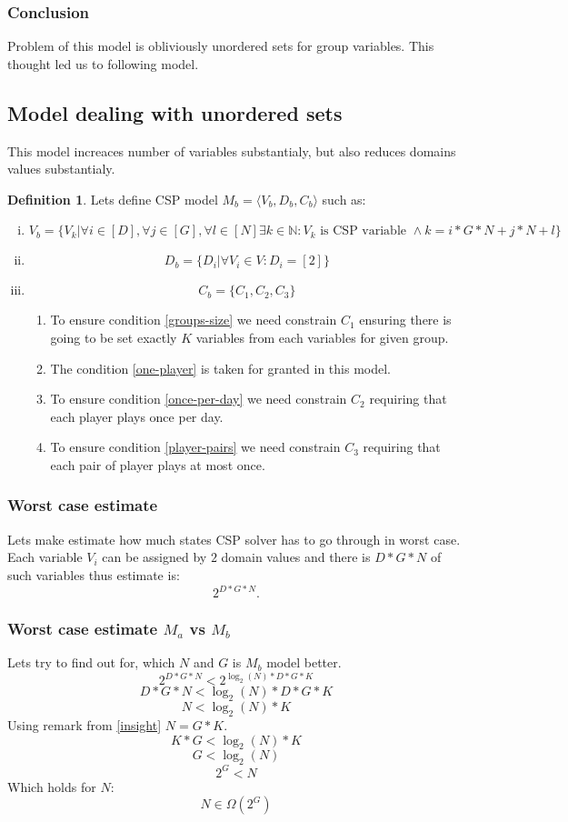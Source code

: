 \documentclass[a4paper]{article}
\theoremstyle{definition}
\newtheorem{definition}{Definition}[section]
\theoremstyle{remark}
\newcommand{\mdef}[2]{
	\theoremstyle{definition}
	\begin{definition}{#1}
	#2
	\end{definition}
}
\begin{document}
\subsubsection{Conclusion}
Problem of this model is obliviously unordered sets for group variables. 
This thought led us to following model.

\subsection{Model dealing with unordered sets}
This model increaces number of variables substantialy, but also reduces domains values substantialy.
\mdef{}{ Lets define CSP model $M_b = \langle V_b,D_b,C_b \rangle$ such as:
	\begin{enumerate}[(i)]
		\item $$ V_b = \{V_k|  \forall i \in [D], \forall j \in [G], \forall l \in [N] \exists k \in \mathbb{N}: V_k \text{ is CSP variable } \land  k=i*G*N+j*N+l \} $$
		\item $$ D_b = \{D_i| \forall V_i \in V: D_i = [2] \} $$
		\item $$ C_b = \{ C_1, C_2, C_3\} $$
		\begin{enumerate}
			\item To ensure condition \ref{groups-size} we need constrain $C_1$ ensuring there is going to be
			set exactly $K$ variables from each variables for given group.
			\item The condition \ref{one-player} is taken for granted in this model.
			\item To ensure condition \ref{once-per-day} we need constrain $C_2$ requiring that each player plays once per day. 
			\item To ensure condition \ref{player-pairs} we need constrain $C_3$ requiring that each pair of player plays at most once.
		\end{enumerate}
	\end{enumerate}
}

\subsubsection{Worst case estimate}

Lets make estimate how much states CSP solver has to go through in worst case.
Each variable $V_i$ can be assigned by $2$ domain values and there is 
$D*G*N$ of such variables thus estimate is:
$$2^{D*G*N}.$$

\subsubsection{Worst case estimate $M_a$ vs $M_b$}
Lets try to find out for, which $N$ and $G$ is $M_b$ model better.
$$2^{D*G*N} < 2^{\log_2{(N)}*D*G*K}$$
$$D*G*N < \log_2{(N)}*D*G*K$$
$$ N < \log_2{(N)}*K$$
Using remark from \ref{insight} $N = G*K$.
$$ K*G < \log_2{(N)}*K$$
$$ G < \log_2{(N)}$$
$$ 2^G < N $$
Which holds for $N$:
$$N \in \Omega(2^G)$$
\end{document}
